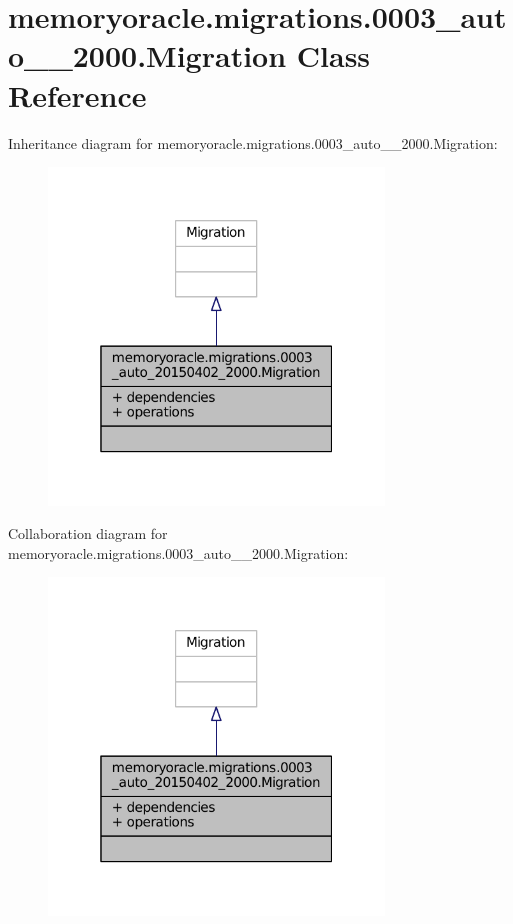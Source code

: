 \hypertarget{classmemoryoracle_1_1migrations_1_10003__auto__20150402__2000_1_1Migration}{}\section{memoryoracle.\+migrations.0003\+\_\+auto\+\_\+\_\+2000.Migration Class Reference}
\label{classmemoryoracle_1_1migrations_1_10003__auto__20150402__2000_1_1Migration}


Inheritance diagram for memoryoracle.\+migrations.0003\+\_\+auto\+\_\+\_\+2000.Migration\+:\nopagebreak
\begin{figure}[H]
\begin{center}
\leavevmode
\includegraphics[width=253pt]{classmemoryoracle_1_1migrations_1_10003__auto__20150402__2000_1_1Migration__inherit__graph}
\end{center}
\end{figure}


Collaboration diagram for memoryoracle.\+migrations.0003\+\_\+auto\+\_\+\_\+2000.Migration\+:\nopagebreak
\begin{figure}[H]
\begin{center}
\leavevmode
\includegraphics[width=253pt]{classmemoryoracle_1_1migrations_1_10003__auto__20150402__2000_1_1Migration__coll__graph}
\end{center}
\end{figure}
